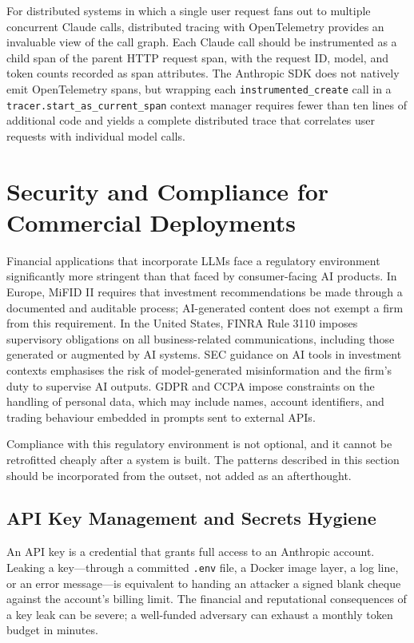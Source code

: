 For distributed systems in which a single user request fans out to multiple
concurrent Claude calls, distributed tracing with OpenTelemetry provides an
invaluable view of the call graph. Each Claude call should be instrumented as a child
span of the parent HTTP request span, with the request ID, model, and token counts
recorded as span attributes. The Anthropic SDK does not natively emit OpenTelemetry
spans, but wrapping each \texttt{instrumented\_create} call in a
\texttt{tracer.start\_as\_current\_span} context manager requires fewer than ten lines
of additional code and yields a complete distributed trace that correlates user
requests with individual model calls.

\section{Security and Compliance for Commercial Deployments}
\label{app:sdk-commercial:security}

Financial applications that incorporate LLMs face a regulatory environment
significantly more stringent than that faced by consumer-facing AI products. In
Europe, MiFID II requires that investment recommendations be made through a
documented and auditable process; AI-generated content does not exempt a firm from
this requirement. In the United States, FINRA Rule 3110 imposes supervisory obligations
on all business-related communications, including those generated or augmented by AI
systems. SEC guidance on AI tools in investment contexts emphasises the risk of
model-generated misinformation and the firm's duty to supervise AI outputs. GDPR and
CCPA impose constraints on the handling of personal data, which may include names,
account identifiers, and trading behaviour embedded in prompts sent to external APIs.

Compliance with this regulatory environment is not optional, and it cannot be
retrofitted cheaply after a system is built. The patterns described in this section
should be incorporated from the outset, not added as an afterthought.

\subsection{API Key Management and Secrets Hygiene}
\label{app:sdk-commercial:security:keys}

An API key is a credential that grants full access to an Anthropic account. Leaking a
key---through a committed \texttt{.env} file, a Docker image layer, a log line, or
an error message---is equivalent to handing an attacker a signed blank cheque against
the account's billing limit. The financial and reputational consequences of a key leak
can be severe; a well-funded adversary can exhaust a monthly token budget in minutes.

